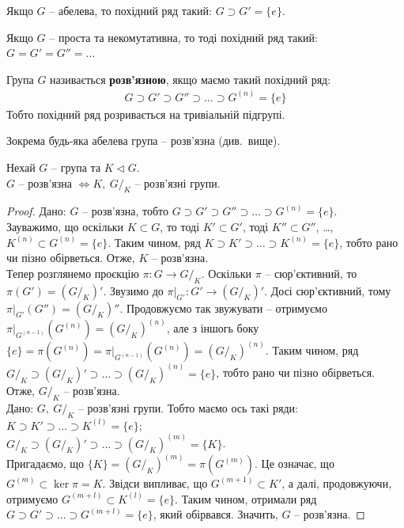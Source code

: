 \documentclass{math_library}
\begin{document}
\begin{remark}
Якщо $G$ -- абелева, то похідний ряд такий: $G \supset G' = \{e\}$.
\end{remark}

\begin{remark}
Якщо $G$ -- проста та некомутативна, то тоді похідний ряд такий: $G = G' = G'' = \dots$
\end{remark}

\begin{definition}
Група $G$ називається \textbf{розв'язною}, якщо маємо такий похідний ряд:
\begin{align*}
G \supset G' \supset G'' \supset \dots \supset G^{(n)} = \{e\}
\end{align*}
Тобто похідний ряд розривається на тривіальній підгрупі.
\end{definition}

\begin{remark}
Зокрема будь-яка абелева група -- розв'язна (див.\ вище).
\end{remark}

\begin{theorem}
Нехай $G$ -- група та $K \triangleleft G$.\\
$G$ -- розв'язна $\iff K,\ G/_K$ -- розв'язні групи.
\end{theorem}

\begin{proof}
\rightproof Дано: $G$ -- розв'язна, тобто $G \supset G' \supset G'' \supset \dots \supset G^{(n)} = \{e\}$. \\
Зауважимо, що оскільки $K \subset G$, то тоді $K' \subset G'$, тоді $K'' \subset G''$, \dots, $K^{(n)} \subset G^{(n)} = \{e\}$. Таким чином, ряд $K \supset K' \supset \dots \supset K^{(n)} = \{e\}$, тобто рано чи пізно обірветься. Отже, $K$ -- розв'язна.\\
Тепер розглянемо проєкцію $\pi \colon G \to G/_K$. Оскільки $\pi$ -- сюр'єктивний, то $\pi(G') = (G/_K)'$. Звузимо до $\pi|_{G'} \colon G' \to (G/_K)'$. Досі сюр'єктивний, тому $\pi|_{G'}(G'') = (G/_K)''$. Продовжуємо так звужувати -- отримуємо $\pi|_{G^{(n-1)}}(G^{(n)}) = (G/_K)^{(n)}$, але з іншогь боку $\{e\} = \pi(G^{(n)}) = \pi|_{G^{(n-1)}}(G^{(n)}) = (G/_K)^{(n)}$. Таким чином, ряд $G/_K \supset (G/_K)' \supset \dots \supset (G/_K)^{(n)} = \{e\}$, тобто рано чи пізно обірветься. Отже, $G/_K$ -- розв'язна.
\bigskip \\
\leftproof Дано: $G,\ G/_K$ -- розв'язні групи. Тобто маємо ось такі ряди:\\
$K \supset K' \supset \dots \supset K^{(l)} = \{e\}$;\\
$G/_K \supset (G/_K)' \supset \dots \supset (G/_K)^{(m)} = \{K\}$.\\
Пригадаємо, що $\{K\} = (G/_K)^{(m)} = \pi(G^{(m)})$. Це означає, що $G^{(m)} \subset \ker \pi = K$. Звідси випливає, що $G^{(m+1)} \subset K'$, а далі, продовжуючи, отримуємо $G^{(m+l)} \subset K^{(l)} = \{e\}$. Таким чином, отримали ряд $G \supset G' \supset \dots \supset G^{(m+l)} = \{e\}$, який обірвався. Значить, $G$ -- розв'язна.
\end{proof}
\end{document}
